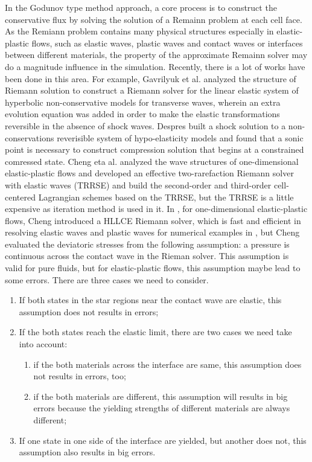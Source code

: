 \documentclass{article}
\numberwithin{equation}{section}
\numberwithin{table}{section}
\begin{document}
In the  Godunov type method  approach,  a core process is to construct the conservative flux by solving  the solution of a  Remainn problem  at each cell face. As the Remiann problem contains many physical structures especially in elastic-plastic flows, such as elastic waves, plastic waves and contact waves or interfaces between different materials, the property of the approximate Remainn solver may do a magnitude influence in the simulation. Recently, there is a lot of works have been done in this area. For example, Gavrilyuk et al. \cite{gavrilyuk2008modelling} analyzed the structure of Riemann solution to construct a Riemann solver for the linear elastic system  of hyperbolic non-conservative models for transverse waves, wherein an extra evolution equation was added in order to make the elastic transformations reversible in the absence of shock waves. Despres \cite{despres2007geometrical} built a shock solution to a non-conservations reverisible system of hypo-elasticity models and found that a sonic point is necessary to construct compression solution that begins at a constrained comressed state.  Cheng eta al.  \cite{cheng2015high} analyzed the wave structures of one-dimensional elastic-plastic flows and developed an effective two-rarefaction Riemann solver with elastic waves (TRRSE) and build the second-order and third-order cell-centered Lagrangian schemes based on the TRRSE, but the TRRSE is a little  expensive as iteration method is used in it.  
In \cite{cheng2016harten}, for one-dimensional elastic-plastic flows, Cheng introduced a HLLCE Riemann solver, which is fast and efficient in resolving elastic waves and plastic waves for numerical examples in \cite{cheng2016harten}, but Cheng evaluated the deviatoric stresses from the following assumption: a pressure is continuous across the contact wave in the Rieman solver. This assumption is valid for pure fluids, but for elastic-plastic flows, this assumption maybe lead to some errors. There are three cases we need  to consider. 
\begin{enumerate}
  \item If both states in the star regions near the contact wave are elastic, this assumption does not results in errors;
  \item If the both states reach the elastic limit, there are two cases we need take into account:
  \begin{enumerate}
    \item if the both materials across the interface are same, this assumption does not results in errors, too; 
    \item if the both materials are different, this assumption will results in big errors because the yielding strengths of different materials are always different; 
  \end{enumerate}
  \item If one state in one side of the interface are yielded, but another does not,  this assumption also results in big errors. 
\end{enumerate}
\end{document}
